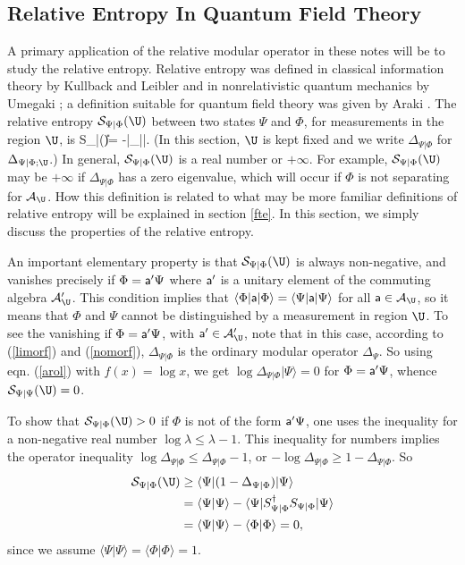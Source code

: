 \documentclass[12pt]{article}
\def\a{{\sf a}}
\def\ra{\rangle}
\def\la{\langle}
\def\S{{\mathcal S}}
\numberwithin{equation}{section}
\def\A{{\mathcal A}}
\begin{document}
\subsection{Relative Entropy In Quantum Field Theory}\label{relen}

A primary application of the relative modular operator in these notes will be to study the relative entropy.    
Relative entropy was defined in  classical information theory by Kullback and Leibler \cite{KL} and in nonrelativistic quantum mechanics 
by Umegaki \cite{Umegaki}; a
definition suitable for quantum
field theory was given by Araki \cite{Araki,Araki2}.  The relative entropy $\S_{\Psi|\Phi}(\U)$ between two states $\Psi$ and $\Phi$,
for measurements in the region $\U$, is
\be\label{onorf}\S_{\Psi|\Phi}(\U)= -\la\Psi|\log \Delta_{\Psi|\Phi}|\Psi\ra. \ee 
(In this section, $\U$ is kept fixed and we write $\Delta_{\Psi|\Phi}$ for $\Delta_{\Psi|\Phi;\U}$.)
In general, $\S_{\Psi|\Phi}(\U)$  is a real number or $+\infty$. For example, $\S_{\Psi|\Phi}(\U)$ may be $+\infty$ if $\Delta_{\Psi|\Phi}$
has a zero eigenvalue, which will occur if $\Phi$ is not separating for $\A_\U$.
How this definition is related to what may be more familiar definitions of relative entropy will be explained in section \ref{fte}.
In this section, we simply discuss the properties of the relative entropy.

An important elementary property is that $\S_{\Psi|\Phi}(\U)$ is always non-negative, and vanishes precisely if $\Phi=\a'\Psi$
where $\a'$ is a unitary element of the commuting algebra $\A_\U'$.  This condition implies that $\la\Phi|\a|\Phi\ra=\la\Psi|\a|\Psi\ra$
for all $\a\in\A_\U$, so it 
means that $\Phi$ and $\Psi$ cannot be distinguished by a measurement in region $\U$.
To see the vanishing if $\Phi=\a'\Psi$, with $\a'\in\A_\U'$, note that in this case, according to (\ref{limorf}) and (\ref{nomorf}),
 $\Delta_{\Psi|\Phi}$ is the ordinary modular operator $\Delta_\Psi$.  So using eqn. (\ref{arol}) with $f(x)=\log x$,
we get $\log \Delta_{\Psi|\Phi}|\Psi\ra=0$ for $\Phi=\a'\Psi$, whence $\S_{\Psi|\Psi}(\U)=0$.

To show that $\S_{\Psi|\Phi}(\U)>0$ if $\Phi$ is not of the form $\a'\Psi$, one uses \cite{Araki} the inequality
for a non-negative real number $\log \lambda \leq \lambda -1$.    This inequality for numbers implies the operator inequality
$\log \Delta_{\Psi|\Phi} \leq \Delta_{\Psi|\Phi} -1$, or $-\log \Delta_{\Psi|\Phi}\geq 1-\Delta_{\Psi|\Phi}$.   So
\begin{align}
\begin{split}
\label{zonorf}\S_{\Psi|\Phi}(\U) &\geq  \la\Psi|(1-\Delta_{\Psi|\Phi})|\Psi\ra \\
& =\la\Psi|\Psi\ra -\la\Psi|S^\dagger_{\Psi|\Phi}S_{\Psi|\Phi} |\Psi\ra \\
& =\la\Psi|\Psi\ra - \la\Phi|\Phi\ra = 0,
\end{split}
\end{align}
since we assume $\la \Psi|\Psi\ra=\la \Phi|\Phi\ra=1$. 
\end{document}
